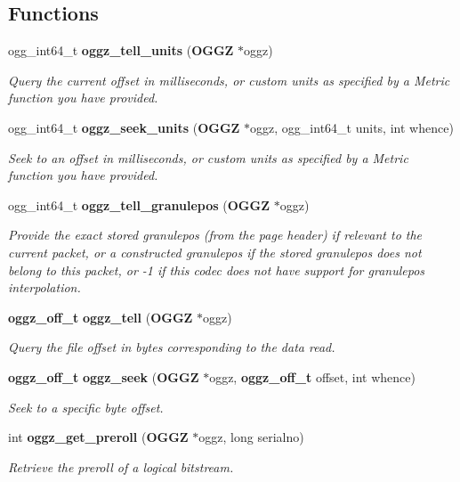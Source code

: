 \subsection*{Functions}
\begin{DoxyCompactItemize}
\item 
ogg\-\_\-int64\-\_\-t {\bf oggz\-\_\-tell\-\_\-units} ({\bf O\-G\-G\-Z} $\ast$oggz)
\begin{DoxyCompactList}\small\item\em Query the current offset in milliseconds, or custom units as specified by a Metric function you have provided. \end{DoxyCompactList}\item 
ogg\-\_\-int64\-\_\-t {\bf oggz\-\_\-seek\-\_\-units} ({\bf O\-G\-G\-Z} $\ast$oggz, ogg\-\_\-int64\-\_\-t units, int whence)
\begin{DoxyCompactList}\small\item\em Seek to an offset in milliseconds, or custom units as specified by a Metric function you have provided. \end{DoxyCompactList}\item 
ogg\-\_\-int64\-\_\-t {\bf oggz\-\_\-tell\-\_\-granulepos} ({\bf O\-G\-G\-Z} $\ast$oggz)
\begin{DoxyCompactList}\small\item\em Provide the exact stored granulepos (from the page header) if relevant to the current packet, or a constructed granulepos if the stored granulepos does not belong to this packet, or -\/1 if this codec does not have support for granulepos interpolation. \end{DoxyCompactList}\item 
{\bf oggz\-\_\-off\-\_\-t} {\bf oggz\-\_\-tell} ({\bf O\-G\-G\-Z} $\ast$oggz)
\begin{DoxyCompactList}\small\item\em Query the file offset in bytes corresponding to the data read. \end{DoxyCompactList}\item 
{\bf oggz\-\_\-off\-\_\-t} {\bf oggz\-\_\-seek} ({\bf O\-G\-G\-Z} $\ast$oggz, {\bf oggz\-\_\-off\-\_\-t} offset, int whence)
\begin{DoxyCompactList}\small\item\em Seek to a specific byte offset. \end{DoxyCompactList}\item 
int {\bf oggz\-\_\-get\-\_\-preroll} ({\bf O\-G\-G\-Z} $\ast$oggz, long serialno)
\begin{DoxyCompactList}\small\item\em Retrieve the preroll of a logical bitstream. \end{DoxyCompactList}\item 

\end{DoxyCompactItemize}
